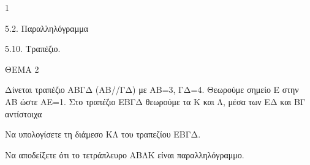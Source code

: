 \begin{ylh}{1}
    \item 5.2. Παραλληλόγραμμα
    \item 5.10. Τραπέζιο.
\end{ylh}

ΘΕΜΑ 2

Δίνεται τραπέζιο ΑΒΓΔ (ΑΒ//ΓΔ) με ΑΒ=3, ΓΔ=4. Θεωρούμε σημείο Ε στην ΑΒ ώστε ΑΕ=1. Στο τραπέζιο ΕΒΓΔ θεωρούμε τα Κ και Λ, μέσα των ΕΔ και ΒΓ αντίστοιχα

\begin{alist}
\item Να υπολογίσετε τη διάμεσο ΚΛ του τραπεζίου ΕΒΓΔ. 

\item Να αποδείξετε ότι το τετράπλευρο ΑΒΛΚ είναι παραλληλόγραμμο. 


\begin{center}
\end{center}
\end{alist}
